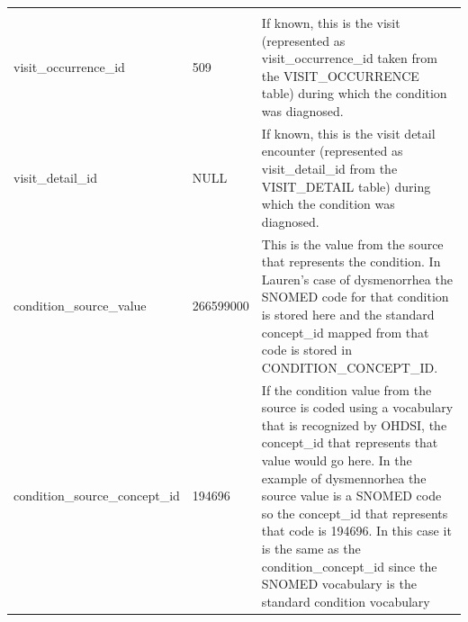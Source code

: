 \documentclass[]{book}
\begin{document}
\begin{longtable}[]{@{}lll@{}}
\begin{minipage}[t]{0.50\columnwidth}
\end{minipage}\tabularnewline
\begin{minipage}[t]{0.27\columnwidth}\raggedright
visit\_occurrence\_id\strut
\end{minipage} & \begin{minipage}[t]{0.14\columnwidth}\raggedright
509\strut
\end{minipage} & \begin{minipage}[t]{0.50\columnwidth}\raggedright
If known, this is the visit (represented as visit\_occurrence\_id taken from the VISIT\_OCCURRENCE table) during which the condition was diagnosed.\strut
\end{minipage}\tabularnewline
\begin{minipage}[t]{0.27\columnwidth}\raggedright
visit\_detail\_id\strut
\end{minipage} & \begin{minipage}[t]{0.14\columnwidth}\raggedright
NULL\strut
\end{minipage} & \begin{minipage}[t]{0.50\columnwidth}\raggedright
If known, this is the visit detail encounter (represented as visit\_detail\_id from the VISIT\_DETAIL table) during which the condition was diagnosed.\strut
\end{minipage}\tabularnewline
\begin{minipage}[t]{0.27\columnwidth}\raggedright
condition\_source\_value\strut
\end{minipage} & \begin{minipage}[t]{0.14\columnwidth}\raggedright
266599000\strut
\end{minipage} & \begin{minipage}[t]{0.50\columnwidth}\raggedright
This is the value from the source that represents the condition. In Lauren's case of dysmenorrhea the SNOMED code for that condition is stored here and the standard concept\_id mapped from that code is stored in CONDITION\_CONCEPT\_ID.\strut
\end{minipage}\tabularnewline
\begin{minipage}[t]{0.27\columnwidth}\raggedright
condition\_source\_concept\_id\strut
\end{minipage} & \begin{minipage}[t]{0.14\columnwidth}\raggedright
194696\strut
\end{minipage} & \begin{minipage}[t]{0.50\columnwidth}\raggedright
If the condition value from the source is coded using a vocabulary that is recognized by OHDSI, the concept\_id that represents that value would go here. In the example of dysmennorhea the source value is a SNOMED code so the concept\_id that represents that code is 194696. In this case it is the same as the condition\_concept\_id since the SNOMED vocabulary is the standard condition vocabulary\strut

\end{minipage}
\end{longtable}
\end{document}
